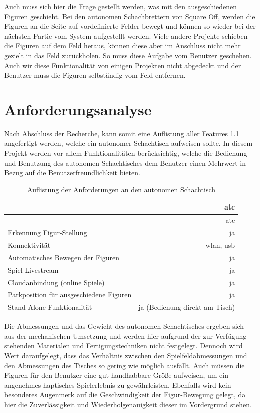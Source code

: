 Auch muss sich hier die Frage gestellt werden, was mit den
ausgeschiedenen Figuren geschieht. Bei den autonomen Schachbrettern von
Square Off\cite{squareoffgrand}, werden die Figuren an die Seite auf
vordefinierte Felder bewegt und können so wieder bei der nächsten Partie
vom System aufgestellt werden. Viele andere Projekte schieben die
Figuren auf dem Feld heraus, können diese aber im Anschluss nicht mehr
gezielt in das Feld zurückholen. So muss diese Aufgabe vom Benutzer
geschehen. Auch wir diese Funktionalität von einigen Projekten nicht
abgedeckt und der Benutzer muss die Figuren selbständig vom Feld
entfernen.

\hypertarget{anforderungsanalyse}{%
\chapter{Anforderungsanalyse}\label{anforderungsanalyse}}

Nach Abschluss der Recherche, kann somit eine Auflistung aller Features
\ref{atcrequirements} angefertigt werden, welche ein autonomer
Schachtisch aufweisen sollte. In diesem Projekt werden vor allem
Funktionalitäten berücksichtig, welche die Bedienung und Benutzung des
autonomen Schachtisches dem Benutzer einen Mehrwert in Bezug auf die
Benutzerfreundlichkeit bieten.

\begin{longtable}[]{@{}lr@{}}
\caption{Auflistung der Anforderungen an den autonomen Schachtisch
\label{atcrequirements}}\tabularnewline
\toprule
& \gls{atc}\tabularnewline
\midrule
\endfirsthead
\toprule
& \gls{atc}\tabularnewline
\midrule
\endhead
Erkennung Figur-Stellung & ja\tabularnewline
Konnektivität & \gls{wlan}, \gls{usb}\tabularnewline
Automatisches Bewegen der Figuren & ja\tabularnewline
Spiel Livestream & ja\tabularnewline
Cloudanbindung (online Spiele) & ja\tabularnewline
Parkposition für ausgeschiedene Figuren & ja\tabularnewline
Stand-Alone Funktionalität & ja (Bedienung direkt am
Tisch)\tabularnewline
\bottomrule
\end{longtable}

Die Abmessungen und das Gewicht des autonomen Schachtisches ergeben sich
aus der mechanischen Umsetzung und werden hier aufgrund der zur
Verfügung stehenden Materialen und Fertigungstechniken nicht festgelegt.
Dennoch wird Wert daraufgelegt, dass das Verhältnis zwischen den
Spielfeldabmessungen und den Abmessungen des Tisches so gering wie
möglich ausfällt. Auch müssen die Figuren für den Benutzer eine gut
handhabbare Größe aufweisen, um ein angenehmes haptisches Spielerlebnis
zu gewährleisten. Ebenfalls wird kein besonderes Augenmerk auf die
Geschwindigkeit der Figur-Bewegung gelegt, da hier die Zuverlässigkeit
und Wiederholgenauigkeit dieser im Vordergrund stehen.

